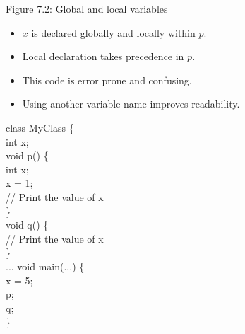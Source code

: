 \documentclass[style=sailor,size=12pt]{powerdot}
\begin{document}
\begin{wideslide}[bm=,toc=]{Figure 7.2: Global and local variables}
\begin{multicols}{2}
\begin{itemize}
\item $x$ is declared globally and locally within $p$.
\item Local declaration takes precedence in $p$.
\item This code is error prone and confusing.
\item Using another variable name improves readability.
\end{itemize}
\vspace*{-2ex}
\begin{program}
class MyClass \{\\
\>int x;\\
\>void p() \{\\
\>\>int x;\\
\>\>x = 1;\\
\>\>// Print the value of x\\
\>\}\\
\>void q() \{\\
\>\>// Print the value of x\\
\>\}\\
\>... void main(...) \{\\
\>x = 5;\\
\>p;\\
\>q;\\
\}
\end{program}
\end{multicols}
\end{wideslide}
\end{document}
